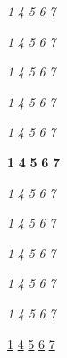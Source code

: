 \usepackage{soul}  %


\let\booktitle\textit
\soulregister\booktitle1
\soulregister\booktitle4
\soulregister\booktitle5
\soulregister\booktitle6
\soulregister\booktitle7

\let\book\textit
\soulregister\book1
\soulregister\book4
\soulregister\book5
\soulregister\book6
\soulregister\book7

\let\journaltitle\textit
\soulregister\journaltitle1
\soulregister\journaltitle4
\soulregister\journaltitle5
\soulregister\journaltitle6
\soulregister\journaltitle7

\let\journal\textit
\soulregister\journal1
\soulregister\journal4
\soulregister\journal5
\soulregister\journal6
\soulregister\journal7

\let\newspaper\textit
\soulregister\newspaper1
\soulregister\newspaper4
\soulregister\newspaper5
\soulregister\newspaper6
\soulregister\newspaper7

\let\vol\textbf  %
\soulregister\vol1
\soulregister\vol4
\soulregister\vol5
\soulregister\vol6
\soulregister\vol7 

\let\latin\textit
\soulregister\latin1
\soulregister\latin4
\soulregister\latin5
\soulregister\latin6
\soulregister\latin7 


\let\french\textit
\soulregister\french1
\soulregister\french4
\soulregister\french5
\soulregister\french6
\soulregister\french7

\let\greek\textit
\soulregister\greek1
\soulregister\greek4
\soulregister\greek5
\soulregister\greek6
\soulregister\greek7

\let\german\textit
\soulregister\german1
\soulregister\german4
\soulregister\german5
\soulregister\german6
\soulregister\german7

\let\italian\textit
\soulregister\italian1
\soulregister\italian4
\soulregister\italian5
\soulregister\italian6
\soulregister\italian7

\soulregister\uline1
\soulregister\uline4
\soulregister\uline5
\soulregister\uline6
\soulregister\uline7  %

\soulregister{}
\soulregister{}
\soulregister{}
\soulregister{}
\soulregister{}  %



